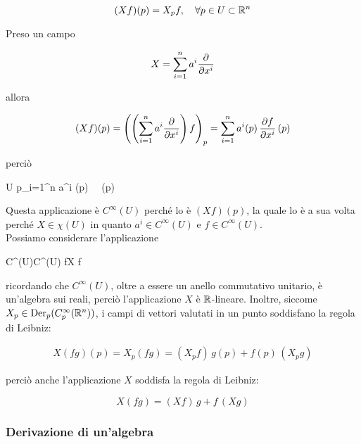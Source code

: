 \begin{equation}
	(X f) (p) = X_{p} f \qcomma \forall p \in U \subset \R^{n}
\end{equation}

Preso un campo

\begin{equation}
	X = \sum_{i=1}^{n} a^{i} \pdv{x^{i}}
\end{equation}

allora

\begin{equation}
	(X f) (p) = \left( \left( \sum_{i=1}^{n} a^{i} \pdv{x^{i}} \right) f \right)_{p} = \sum_{i=1}^{n} a^{i} (p) \, \pdv{f}{x^{i}} \, (p)
\end{equation}

perciò

	{U}{\R}
	{p}{\sum_{i=1}^{n} a^{i} (p) \,  \, (p)}

Questa applicazione è $ C^{\infty}(U) $ perché lo è $ (X f) (p) $, la quale lo è a sua volta perché $ X \in \chi(U) $ in quanto $ a^{i} \in C^{\infty}(U) $ e $ f \in C^{\infty}(U) $.\\
Possiamo considerare l'applicazione


	{C^{\infty}(U)}{C^{\infty}(U)}
	{f}{X f}

ricordando che $ C^{\infty}(U) $, oltre a essere un anello commutativo unitario, è un'algebra sui reali, perciò l'applicazione $ X $ è $ \mathbb{R} $-lineare. Inoltre, siccome $ X_{p} \in \operatorname{Der}_{p}(C_{p}^{\infty}(\mathbb{R}^{n})) $, i campi di vettori valutati in un punto soddisfano la regola di Leibniz:

\begin{align}
	X (f g) (p) = X_{p} (f g) = (X_{p} f) \, g(p) + f(p) \, (X_{p} g)
\end{align}

perciò anche l'applicazione $ X $ soddisfa la regola di Leibniz:

\begin{equation}
	X (f g) = (X f) \, g + f \, (X g)
\end{equation}

\subsubsection{Derivazione di un'algebra}

